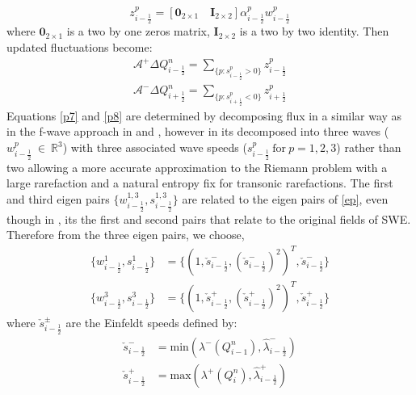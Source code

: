 \documentclass[11pt,a4paper]{article}
\begin{document}
	\begin{equation}
		z_{i-\frac{1}{2}}^{p} = [\mathbf{0}_{2\times1} \quad \mathbf{I}_{2\times2}] \alpha_{i-\frac{1}{2}}^{p} w_{i-\frac{1}{2}}^{p}
	\end{equation}
	where $\mathbf{0}_{2\times1}$ is a two by one zeros matrix, $\mathbf{I}_{2\times2}$ is a two by two identity. Then updated fluctuations become:
	\begin{eqnarray}
		\mathcal{A^{+}}\Delta Q_{i-\frac{1}{2}}^{n} = \sum_{\{ p:s_{i-\frac{1}{2}}^{p}>0\}}  z_{i-\frac{1}{2}}^{p}
		\label{p7}\\
		\mathcal{A^{-}}\Delta Q_{i+\frac{1}{2}}^{n} = \sum_{\{ p:s_{i+\frac{1}{2}}^{p}<0\}} z_{i+\frac{1}{2}}^{p}
		\label{p8}
	\end{eqnarray}
	Equations \ref{p7} and \ref{p8} are determined by decomposing flux in a similar way as in the f-wave approach in \citet{ba-le-mi-ro:2003} and \citet{george2006finite}, however in  \citet{ge:2008}  its decomposed into three waves ($w^{p}_{i-\frac{1}{2}} ~\in ~\mathbb{R}^{3}$)  with three associated wave speeds ($s^{p}_{i-\frac{1}{2}} ~\text{for}~ p =1,2,3$)  rather than two  allowing a more accurate approximation to the Riemann problem with a large rarefaction and a natural entropy fix for transonic rarefactions. The first and third eigen pairs $\{w^{1,3}_{i-\frac{1}{2}},s^{1,3}_{i-\frac{1}{2}}\}  $    are related to the eigen pairs of \eqref{ep}, even though in  \citet{be-ge-le-ma:2011}, its the first and second pairs that relate to the original fields of SWE. Therefore from the three eigen pairs, we choose, 
	\begin{equation}
		\begin{aligned}
			\{w^{1}_{i-\frac{1}{2}},s^{1}_{i-\frac{1}{2}}\} &= \{(1,\check{s}_{i-\frac{1}{2}}^{-} ,(\check{s}_{i-\frac{1}{2}}^{-} )^{2})^{T},\check{s}_{i-\frac{1}{2}}^{-} \} \\
			\{w^{3}_{i-\frac{1}{2}},s^{3}_{i-\frac{1}{2}}\} &= \{(1,\check{s}_{i-\frac{1}{2}}^{+} ,(\check{s}_{i-\frac{1}{2}}^{+} )^{2})^{T},\check{s}_{i-\frac{1}{2}}^{+} \} 
		\end{aligned}
	\end{equation}
	where $\check{s}_{i-\frac{1}{2}}^{\pm}$ are the Einfeldt speeds \cite{barzgaran2019numerical,ge:2008,be-ge-le-ma:2011} defined by:
	\begin{equation}
		\begin{aligned}
			\check{s}_{i-\frac{1}{2}}^{-} &= \text{min}(\lambda^{-}(Q^n_{i-1}),\hat{\lambda}_{i-\frac{1}{2}}^{-}) \\
			\check{s}_{i-\frac{1}{2}}^{+} &= \text{max}(\lambda^{+}(Q^n_{i}),\hat{\lambda}_{i-\frac{1}{2}}^{+})
		\end{aligned}
		\label{EE}
	\end{equation}
\end{document}
